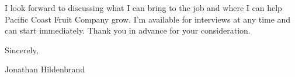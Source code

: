 \documentclass[letterpaper,12pt]{article}[leftmargin=*]
\begin{document}
\vspace{12pt}

\hspace{24pt}I look forward to discussing what I can bring to the job and where I can help Pacific Coast Fruit Company grow. I'm available for interviews at any time and can start immediately. Thank you in advance for your consideration.

\vspace{24pt}

Sincerely,

\vspace{12pt}

Jonathan Hildenbrand

\end{document}
